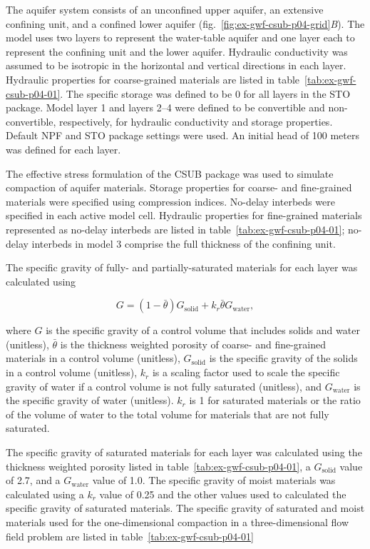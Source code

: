 The aquifer system consists of an unconfined upper aquifer, an extensive confining unit, and a confined lower aquifer (fig.~\ref{fig:ex-gwf-csub-p04-grid}\textit{B}). The model uses two layers to represent the water-table aquifer and one layer each to represent the confining unit and the lower aquifer. Hydraulic conductivity was assumed to be isotropic in the horizontal and vertical directions in each layer. Hydraulic properties for coarse-grained materials are listed in table~\ref{tab:ex-gwf-csub-p04-01}. The specific storage was defined to be 0 for all layers in the STO package. Model layer 1 and layers 2--4 were defined to be convertible and non-convertible, respectively, for hydraulic conductivity and storage properties. Default NPF and STO package settings were used. An initial head of 100 meters was defined for each layer.



The effective stress formulation of the CSUB package was used to simulate compaction of aquifer materials. Storage properties for coarse- and fine-grained materials were specified using compression indices. No-delay interbeds were specified in each active model cell. Hydraulic properties for fine-grained materials represented as no-delay interbeds are listed in table~\ref{tab:ex-gwf-csub-p04-01}; no-delay interbeds in model 3 comprise the full thickness of the confining unit. 

The specific gravity of fully- and partially-saturated materials for each layer was calculated using 

\begin{equation}
	G = (1 - \bar{\theta}) G_{\text{solid}} + k_r \bar{\theta} G_{\text{water}},
	\label{eq:p4sg}
\end{equation}


\noindent where $G$ is the specific gravity of a control volume that includes solids and water (unitless), $\bar{\theta}$ is the thickness weighted porosity of coarse- and fine-grained materials in a control volume (unitless), $G_{\text{solid}}$ is the specific gravity of the solids in a control volume (unitless), $k_r$ is a scaling factor used to scale the specific gravity of water if a control volume is not fully saturated (unitless), and $G_{\text{water}}$ is the specific gravity of water (unitless). $k_r$ is 1 for saturated materials or the ratio of the volume of water to the total volume for materials that are not fully saturated.

The specific gravity of saturated materials for each layer was calculated using the thickness weighted porosity listed in table~\ref{tab:ex-gwf-csub-p04-01}, a $G_{\text{solid}}$ value of 2.7, and a  $G_{\text{water}}$ value of 1.0. The specific gravity of moist materials was calculated using a $k_r$ value of 0.25 and the other values used to calculated the specific gravity of saturated materials. The specific gravity of saturated and moist materials used for the one-dimensional compaction in a three-dimensional flow field problem are listed in table~\ref{tab:ex-gwf-csub-p04-01}

